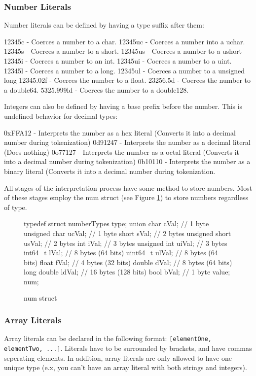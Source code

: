 \documentclass[12pt, letterpaper, oneside]{article}
\begin{document}
	\subsubsection{Number Literals}
	Number literals can be defined by having a type suffix after them:
	\begin{spverbatim}
		12345c - Coerces a number to a char.
		12345uc - Coerces a number into a uchar.
		12345s - Coerces a number to a short.
		12345us - Coerces a number to a ushort
		12345i - Coerces a number to an int.
		12345ui - Coerces a number to a uint.
		12345l - Coerces a number to a long.
		12345ul - Coerces a number to a unsigned long
		12345.02f - Coerces the number to a float.
		23256.5d - Coerces the number to a double64.
		5325.999ld - Coerces the number to a double128.
	\end{spverbatim}
	Integers can also be defined by having a base prefix before the number. This is undefined behavior for decimal types:
	\begin{spverbatim}
		0xFFA12 - Interprets the number as a hex literal (Converts it into a decimal number during tokenization)
		0d91247 - Interprets the number as a decimal literal (Does nothing)
		0o77127 - Interprets the number as a octal literal (Converts it into a decimal number during tokenization)
		0b10110 - Interprets the number as a binary literal (Converts it into a decimal number during tokenization.
	\end{spverbatim}
	All stages of the interpretation process have some method to store numbers. Most of these stages employ the num struct (see Figure \ref{fig:num}) to store numbers regardless of type. 
	\begin{figure}[h]
		\begin{spverbatim}
			typedef struct {
				numberTypes type;
				union {
					char cVal; // 1 byte
					unsigned char ucVal; // 1 byte
					short sVal; // 2 bytes
					unsigned short usVal; // 2 bytes
					int iVal; // 3 bytes
					unsigned int uiVal; // 3 bytes
					int64_t lVal; // 8 bytes (64 bits)
					uint64_t ulVal; // 8 bytes (64 bits)
					float fVal; // 4 bytes (32 bits)
					double dVal; // 8 bytes (64 bits)
					long double ldVal; // 16 bytes (128 bits)
					bool bVal; // 1 byte
				} value;
			} num;
		\end{spverbatim}
		\caption{num struct}
		\label{fig:num}
	\end{figure}
	
	\newpage
	\subsubsection{Array Literals}	
	Array literals can be declared in the following format: \verb|[elementOne, elementTwo, ...]|.
	Literals have to be surrounded by brackets, and have commas seperating elements.
	In addition, array literals are only allowed to have one unique type (e.x, you can't have an array literal with both strings and integers).
	
\end{document}
